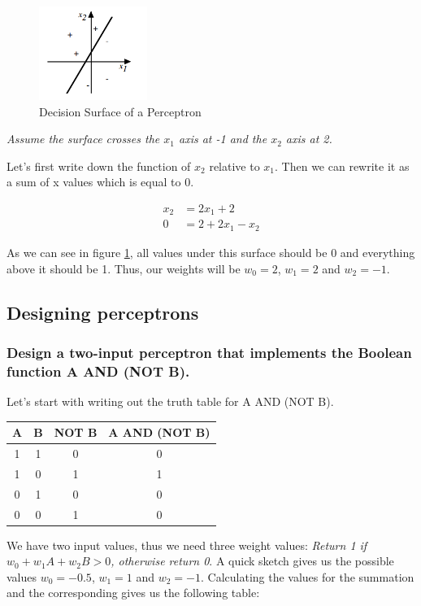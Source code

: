 \documentclass{article}
\begin{document}
\begin{figure}
\begin{center}
	\includegraphics[width=100pt]{perceptron1.png}
\end{center}
	\caption{Decision Surface of a Perceptron}
	\label{fig:perc}
\end{figure}

\textit{Assume the surface crosses the $x_1$ axis at -1 and the $x_2$ axis at 2.}

Let's first write down the function of $x_2$ relative to $x_1$. Then we can rewrite it as a sum of x values which is equal to 0.

\begin{align*}
x_2 &= 2x_1 + 2\\
0&=2+2x_1-x_2
\end{align*}

As we can see in figure \ref{fig:perc}, all values under this surface should be 0 and everything above it should be 1. Thus, our weights will be $w_0 = 2$, $w_1 = 2$ and $w_2 = -1$.

\subsection{Designing perceptrons}
\subsubsection{Design a two-input perceptron that implements the Boolean function A AND (NOT B).}

Let's start with writing out the truth table for A AND (NOT B).

\begin{table}[h!]
\centering
\begin{tabular}{c c c c}
 A & B & NOT B & A AND (NOT B)\\
\hline
1&1&0&0\\
1&0&1&1\\
0&1&0&0\\
0&0&1&0
\end{tabular}
\end{table}

We have two input values, thus we need three weight values: \textit{Return 1 if $w_0 + w_1A + w_2 B > 0$, otherwise return 0}. A quick sketch gives us the possible values $w_0 = -0.5$, $w_1 = 1$ and $w_2 = -1$. Calculating the values for the summation and the corresponding gives us the following table:
\end{document}
